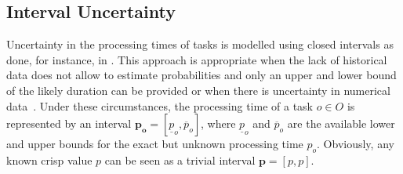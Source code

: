 \documentclass[icae]{iosart2x}
\newcommand{\reviewed}[1]{#1} %
\begin{document}
\subsection{Interval Uncertainty} \label{subsecIntervalDurations}
%
Uncertainty in the processing times of tasks is modelled using closed intervals as done, for instance, in \cite{Lei2011,Diaz2022robust}. This approach is appropriate when the lack of historical data does not allow to estimate probabilities and only an upper and lower bound of the likely duration can be provided \reviewed{or when there is uncertainty in numerical data~\cite{Allahverdi2022,Bustince2010ignorance}.}  Under these circumstances, the processing time of a task $o \in O$ is represented by an interval $\mathbf{p_o}=[\underline{p}_o,\overline{p}_o]$, where  $\underline{p}_o$ and $\overline{p}_o$ are the available lower and upper bounds for the exact but unknown processing time $p_o$. Obviously, any known crisp value $p$ can be seen as a trivial interval $\mathbf{p}=[p,p]$.
\end{document}

